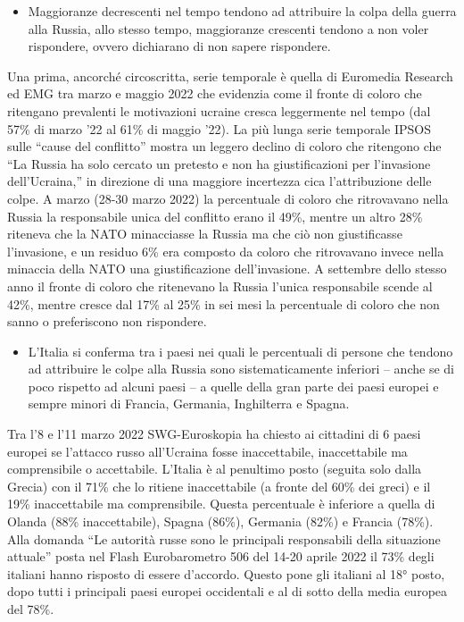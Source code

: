 \documentclass[
  openany]{book}
\providecommand{\tightlist}{%
  \setlength{\itemsep}{0pt}\setlength{\parskip}{0pt}}
\begin{document}
\begin{itemize}
\tightlist
\item
  Maggioranze decrescenti nel tempo tendono ad attribuire la colpa della guerra alla Russia, allo stesso tempo, maggioranze crescenti tendono a non voler rispondere, ovvero dichiarano di non sapere rispondere.
\end{itemize}

Una prima, ancorché circoscritta, serie temporale è quella di Euromedia Research ed EMG tra marzo e maggio 2022 che evidenzia come il fronte di coloro che ritengano prevalenti le motivazioni ucraine cresca leggermente nel tempo (dal 57\% di marzo '22 al 61\% di maggio '22). La più lunga serie temporale IPSOS sulle ``cause del conflitto'' mostra un leggero declino di coloro che ritengono che ``La Russia ha solo cercato un pretesto e non ha giustificazioni per l'invasione dell'Ucraina,'' in direzione di una maggiore incertezza cica l'attribuzione delle colpe. A marzo (28-30 marzo 2022) la percentuale di coloro che ritrovavano nella Russia la responsabile unica del conflitto erano il 49\%, mentre un altro 28\% riteneva che la NATO minacciasse la Russia ma che ciò non giustificasse l'invasione, e un residuo 6\% era composto da coloro che ritrovavano invece nella minaccia della NATO una giustificazione dell'invasione. A settembre dello stesso anno il fronte di coloro che ritenevano la Russia l'unica responsabile scende al 42\%, mentre cresce dal 17\% al 25\% in sei mesi la percentuale di coloro che non sanno o preferiscono non rispondere.

\begin{itemize}
\tightlist
\item
  L'Italia si conferma tra i paesi nei quali le percentuali di persone che tendono ad attribuire le colpe alla Russia sono sistematicamente inferiori -- anche se di poco rispetto ad alcuni paesi -- a quelle della gran parte dei paesi europei e sempre minori di Francia, Germania, Inghilterra e Spagna.
\end{itemize}

Tra l'8 e l'11 marzo 2022 SWG-Euroskopia ha chiesto ai cittadini di 6 paesi europei se l'attacco russo all'Ucraina fosse inaccettabile, inaccettabile ma comprensibile o accettabile. L'Italia è al penultimo posto (seguita solo dalla Grecia) con il 71\% che lo ritiene inaccettabile (a fronte del 60\% dei greci) e il 19\% inaccettabile ma comprensibile. Questa percentuale è inferiore a quella di Olanda (88\% inaccettabile), Spagna (86\%), Germania (82\%) e Francia (78\%). Alla domanda ``Le autorità russe sono le principali responsabili della situazione attuale'' posta nel Flash Eurobarometro 506 del 14-20 aprile 2022 il 73\% degli italiani hanno risposto di essere d'accordo. Questo pone gli italiani al 18° posto, dopo tutti i principali paesi europei occidentali e al di sotto della media europea del 78\%.
\end{document}

